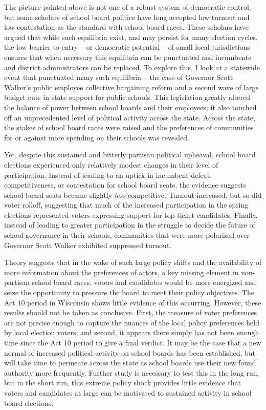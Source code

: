 The picture painted above is not one of a robust system of democratic control, 
but some scholars of school board politics have long accepted low turnout and low 
contestation as the standard with school board races. These scholars have argued 
that while such equilibria exist, and may persist for many election cycles, the 
low barrier to entry -- or democratic potential -- of small local jurisdictions 
ensures that when necessary this equilibria can be punctuated and incumbents and 
district administrators can be replaced. To explore this, I look at a statewide 
event that punctuated many such equilibria -- the case of Governor Scott Walker's 
public employee collective bargaining reform and a second wave of large budget 
cuts in state support for public schools. This legislation greatly 
altered the balance of power between school boards and their employees; it also 
touched off an unprecedented level of political activity across the state. 
Across the state, the stakes of school board races were raised and the preferences of 
communities for or against more spending on their schools was revealed.

Yet, despite this sustained and bitterly partisan political upheaval, school board 
elections experienced only relatively modest changes in their level of 
participation. Instead of leading to an uptick in incumbent defeat, competitiveness, 
or contestation for school board seats, the evidence suggests school board seats 
became slightly \emph{less} competitive. Turnout increased, but so did voter rolloff, suggesting 
that much of the increased participation in the spring elections represented voters 
expressing support for top ticket candidates. Finally, instead of leading to 
greater participation in the struggle to decide the future of school governance 
in their schools, communities that were more polarized over Governor Scott Walker 
exhibited suppressed turnout. 

Theory suggests that in the wake of such large policy shifts and the availability 
of more information about the preferences of actors, a key missing element in 
non-partisan school board races, voters and candidates would be more energized and 
seize the opportunity to pressure the board to meet their policy objectives. The 
Act 10 period in Wisconsin shows little evidence of this occurring. However, these 
results should not be taken as conclusive. First, the measure of voter preferences 
are not precise enough to capture the nuances of the local policy preferences held 
by local election voters, and second, it appears there simply has 
not been enough time since the Act 10 period to give a final verdict. It may be 
the case that a new normal of increased political activity on school boards has 
been established, but will take time to permeate across the state as school boards 
use their new found authority more frequently. Further study is necessary to test 
this in the long run, but in the short run, this extreme policy shock provides 
little evidence that voters and candidates at large can be motivated to sustained 
activity in school board elections. 

